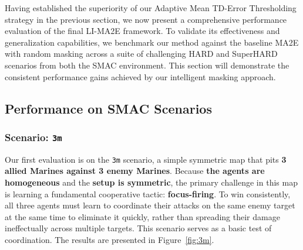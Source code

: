 Having established the superiority of our Adaptive Mean TD-Error Thresholding strategy in the previous section, we now present a comprehensive performance evaluation of the final LI-MA2E framework. To validate its effectiveness and generalization capabilities, we benchmark our method against the baseline MA2E with random masking across a suite of challenging HARD and SuperHARD scenarios from both the SMAC environment. This section will demonstrate the consistent performance gains achieved by our intelligent masking approach.
\subsection{Performance on SMAC Scenarios}




\subsubsection{Scenario: \texttt{3m}}
Our first evaluation is on the \texttt{3m} scenario, a simple symmetric map that pits \textbf{3 allied Marines against 3 enemy Marines}. Because  \textbf{the agents are homogeneous} and the \textbf{setup is symmetric}, the primary challenge in this map is learning a fundamental cooperative tactic: \textbf{focus-firing}. To win consistently, all three agents must learn to coordinate their attacks on the same enemy target at the same time to eliminate it quickly, rather than spreading their damage ineffectually across multiple targets. This scenario serves as a basic test of coordination. The results are presented in Figure~\ref{fig:3m}.

